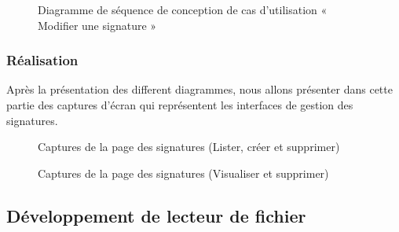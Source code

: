 \begin{figure}[H]
  \centering
  \caption{Diagramme de séquence de conception de cas d'utilisation « Modifier une signature  »}
  \label{fig:sequence_conception_update_signature}
\end{figure}

\subsubsection{Réalisation}

Après la présentation des different diagrammes, nous allons présenter dans cette partie des captures d'écran qui représentent les interfaces de gestion des signatures.
\begin{figure}[H]
  \centering
  \caption{Captures de la page des signatures (Lister, créer et supprimer)}
  \label{fig:realisation_signatures}
\end{figure}

\begin{figure}[H]
  \centering
  \caption{Captures de la page des signatures (Visualiser et supprimer)}
  \label{fig:realisation_preview_delete_signature}
\end{figure}


\subsection{Développement de lecteur de fichier}

